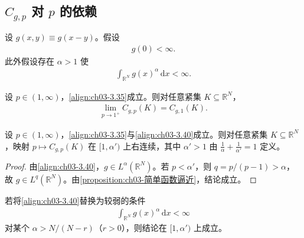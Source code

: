 \documentclass[../../main.tex]{subfiles}%
\begin{document}
\subsection{$C_{g,p}$ 对 $p$ 的依赖}\label{subsection:ch03-p依赖}

设 $g(x,y)\equiv g(x-y)$。假设
\begin{align}
g(0)<\infty.\label{align:ch03-3.35}
\end{align}
此外假设存在 $\alpha>1$ 使
\begin{align}
\int_{\mathbb{R}^N}g(x)^\alpha\,\mathrm{d}x<\infty.\label{align:ch03-3.40}
\end{align}

\begin{lemma}\label{lemma:ch03-p趋近1}
设 $p\in(1,\infty)$，\eqref{align:ch03-3.35}成立。则对任意紧集 $K\subseteq\mathbb{R}^N$，
\begin{align*}
\lim_{p\to1^+}C_{g,p}(K)=C_{g,1}(K).
\end{align*}
\end{lemma}

\begin{proposition}\label{proposition:ch03-p趋近1}
设 $p\in(1,\infty)$，\eqref{align:ch03-3.35}与\eqref{align:ch03-3.40}成立。则对任意紧集 $K\subseteq\mathbb{R}^N$，映射 $p\mapsto C_{g,p}(K)$ 在 $[1,\alpha')$ 上右连续，其中 $\alpha'>1$ 由 $\frac1\alpha+\frac1{\alpha'}=1$ 定义。
\end{proposition}

\begin{proof}
由\eqref{align:ch03-3.40}，$g\in L^\alpha(\mathbb{R}^N)$。若 $p<\alpha'$，则 $q=p/(p-1)>\alpha$，故 $g\in L^q(\mathbb{R}^N)$。由\cref{proposition:ch03-简单函数逼近}，结论成立。
\end{proof}

\begin{remark}\label{remark:ch03-条件替换}
若将\eqref{align:ch03-3.40}替换为较弱的条件
\begin{align}
\int_{\mathbb{R}^N}g(x)^{\alpha}\,\mathrm{d}x<\infty\label{align:ch03-3.40b}
\end{align}
对某个 $\alpha>N/(N-r)$（$r>0$），则结论在 $[1,\alpha')$ 上成立。
\end{remark}
\end{document}
